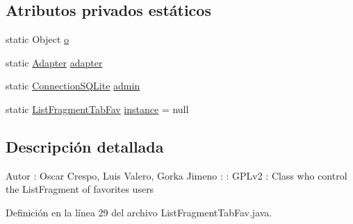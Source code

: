\subsection*{Atributos privados estáticos}
\begin{DoxyCompactItemize}
\item 
static Object \hyperlink{classes_1_1ucm_1_1tfg_1_1controlremotolinux_1_1client_1_1controller_1_1ListFragmentTabFav_a5c6595de9f82e8ff365021392309eb53}{o}
\item 
static \hyperlink{classes_1_1ucm_1_1tfg_1_1controlremotolinux_1_1client_1_1view_1_1Adapter}{Adapter} \hyperlink{classes_1_1ucm_1_1tfg_1_1controlremotolinux_1_1client_1_1controller_1_1ListFragmentTabFav_ad86442ad460cef15600eaf6c82ebd764}{adapter}
\item 
static \hyperlink{classes_1_1ucm_1_1tfg_1_1controlremotolinux_1_1client_1_1model_1_1sql_1_1ConnectionSQLite}{Connection\-S\-Q\-Lite} \hyperlink{classes_1_1ucm_1_1tfg_1_1controlremotolinux_1_1client_1_1controller_1_1ListFragmentTabFav_abf7219fd9037bc599c963d1d8703258d}{admin}
\item 
static \hyperlink{classes_1_1ucm_1_1tfg_1_1controlremotolinux_1_1client_1_1controller_1_1ListFragmentTabFav}{List\-Fragment\-Tab\-Fav} \hyperlink{classes_1_1ucm_1_1tfg_1_1controlremotolinux_1_1client_1_1controller_1_1ListFragmentTabFav_ad0749ea73ee98aaf781ab623a7f1265c}{instance} = null
\end{DoxyCompactItemize}


\subsection{Descripción detallada}
\begin{DoxyAuthor}{Autor}
\-: Oscar Crespo, Luis Valero, Gorka Jimeno  \-:  \-: G\-P\-Lv2  \-: Class who control the List\-Fragment of favorites users 
\end{DoxyAuthor}


Definición en la línea 29 del archivo List\-Fragment\-Tab\-Fav.\-java.



